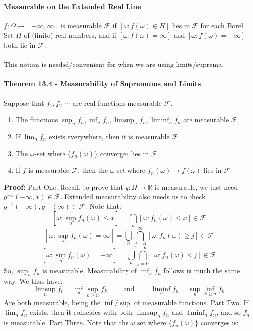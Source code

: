 \documentclass[12pt,a4paper]{article}
\newcommand{\1}[1]{\mathbbm{1}\left\{ #1 \right\}}
\newcommand{\R}{\mathbb{R}}
\newcommand{\fcal}{\mathcal{F}}
\begin{document}
\paragraph{Measurable on the Extended Real Line} $f : \Omega \to [-\infty,\infty]$ is measurable $\fcal$ if $[\omega : f(\omega) \in H]$ lies in $\fcal$ for each Borel Set $H$ of (finite) real numbers, and if $[\omega: f(\omega) = \infty]$ and $[\omega: f(\omega) = -\infty]$ both lie in $\fcal$.
\\\\
This notion is needed/convenient for when we are using limits/suprema.

\paragraph{Theorem 13.4 - Measurability of Supremums and Limits} Suppose that $f_1,f_2,\cdots$ are real functions measurable $\fcal$.
\begin{enumerate}
	\item The functions $\sup_n f_n, \inf_n f_n, \limsup_n f_n, \liminf_n f_n$ are measurable $\fcal$
	\item If $\lim_n f_n$ exists everywhere, then it is measurable $\fcal$
	\item The $\omega$-set where $\{f_n(\omega)\}$ converges lies in $\fcal$
	\item If $f$ is measurable $\fcal$, then the $\omega$-set where $f_n(\omega) \to f(\omega)$ lies in $\fcal$
\end{enumerate}
\textbf{Proof:} Part One. Recall, to prove that $g: \Omega \to \R$ is measurable, we just need $g^{-1}(-\infty,x) \in \fcal$. Extended measurability also needs us to check $g^{-1}(-\infty),g^{-1}(\infty) \in \fcal$. Note that:
$$
	\left[\omega : \sup_n f_n(\omega) \leq x\right] =
	\bigcap_n [\omega : f_n(\omega) \leq x] \in \fcal
$$
$$
	\left[\omega : \sup_n f_n(\omega) = \infty\right] =
	\bigcup_n \bigcap_{j=0}^\infty [\omega : f_n(\omega) \geq j] \in \fcal
$$
$$
	\left[\omega : \sup_n f_n(\omega) = -\infty\right] =
	\bigcup_n \bigcap_{j = 0}^{-\infty} [\omega : f_n(\omega) \leq j] \in \fcal
$$
So, $\sup_n f_n$ is measurable. Measurability of $\inf_n f_n$ follows in much the same way. We thus have:
$$
	\limsup_n f_n = \inf_n \sup_{k \geq n} f_k
	\quad\quad\text{ and }\quad\quad
	\liminf_n f_n = \sup_n \inf_{k \geq n} f_k
$$
Are both measurable, being the $\inf/\sup$ of measurable functions. Part Two. If $\lim_n f_n$ exists, then it coincides with both $\limsup_n f_n$ and $\liminf_n f_n$, and so $f_n$ is measurable. Part Three. Note that the $\omega$ set where $\{f_n(\omega)\}$ converges is:
\end{document}
